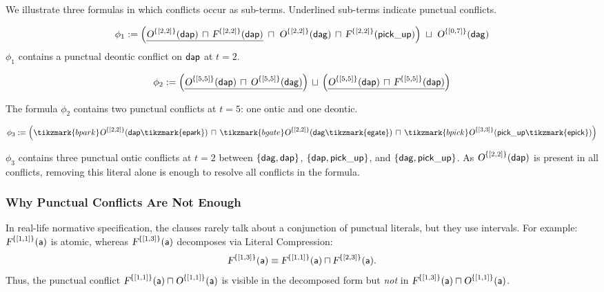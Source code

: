 \begin{example}
We illustrate three formulas in which conflicts occur as sub-terms. Underlined sub-terms indicate punctual conflicts.

$$
\phi_1 :=
\Big(
  \underline{\textsl{O}^{\{[2,2]\}}(\mathsf{\mathsf{dap}}) \,\sqcap\, \textsl{F}^{\{[2,2]\}}(\mathsf{\mathsf{dap}})}
\;\sqcap\;
  \textsl{O}^{\{[2,2]\}}(\mathsf{\mathsf{dag}}) \,\sqcap\, \textsl{F}^{\{[2,2]\}}(\mathsf{{\mathsf{pick\_up}}})
\Big)
\;\sqcup\;
\textsl{O}^{\{[0,7]\}}(\mathsf{\mathsf{dag}})
$$
$\phi_1$ contains a punctual deontic conflict on $\mathsf{dap}$ at $t=2$.

$$
\phi_2 :=
\Big(
  \underline{\textsl{O}^{\{[5,5]\}}(\mathsf{\mathsf{dap}}) \,\sqcap\, \textsl{O}^{\{[5,5]\}}(\mathsf{\mathsf{dag}})}
\Big)
\,\sqcup\,
\Big(
  \underline{\textsl{O}^{\{[5,5]\}}(\mathsf{\mathsf{dap}}) \,\sqcap\, \textsl{F}^{\{[5,5]\}}(\mathsf{\mathsf{dap}})}
\Big)
$$

The formula $\phi_2$ contains two punctual conflicts at $t=5$: one ontic and one deontic.

$$
\phi_3 :=
\Big(
  \tikzmark{bpark}\ob{\{[2,2]\}}{\delAtPark\tikzmark{epark}}
  \, \sqcap\,
  \tikzmark{bgate}\ob{\{[2,2]\}}{\delAtGate\tikzmark{egate}}
  \, \sqcap\,
  \tikzmark{bpick}\ob{\{[3,3]\}}{\pickU\tikzmark{epick}}
\Big)
$$


\noindent
$\phi_3$ contains three punctual ontic conflicts at $t=2$ between
$\{\mathsf{dag},\mathsf{dap}\}$,
$\{\mathsf{dap},{\mathsf{pick\_up}}\}$, and
$\{\mathsf{dag},{\mathsf{pick\_up}}\}$.
As $\textsl{O}^{\{[2,2]\}}(\mathsf{\mathsf{dap}})$ is present in all conflicts, removing this literal alone is enough to resolve all conflicts in the formula.
\end{example}

\subsubsection{Why Punctual Conflicts Are Not Enough}
In real-life normative specification, the clauses rarely talk about a conjunction of punctual literals, but they use intervals. For example:
$\textsl{F}^{\{[1,1]\}}(\mathsf{a})$ is atomic, whereas
$\textsl{F}^{\{[1,3]\}}(\mathsf{a})$ decomposes via Literal Compression:
\[
\textsl{F}^{\{[1,3]\}}(\mathsf{a})
\equiv
\textsl{F}^{\{[1,1]\}}(\mathsf{a}) \sqcap \textsl{F}^{\{[2,3]\}}(\mathsf{a}).
\]
Thus, the punctual conflict
$\textsl{F}^{\{[1,1]\}}(\mathsf{a}) \sqcap \textsl{O}^{\{[1,1]\}}(\mathsf{a})$
is visible in the decomposed form but \emph{not} in
$\textsl{F}^{\{[1,3]\}}(\mathsf{a}) \sqcap \textsl{O}^{\{[1,1]\}}(\mathsf{a})$.

